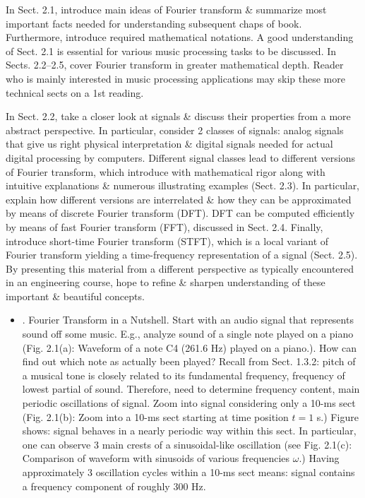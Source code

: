 \documentclass{article}
\begin{document}
\begin{itemize}
	In Sect. 2.1, introduce main ideas of Fourier transform \& summarize most important facts needed for understanding subsequent chaps of book. Furthermore, introduce required mathematical notations. A good understanding of Sect. 2.1 is essential for various music processing tasks to be discussed. In Sects. 2.2--2.5, cover Fourier transform in greater mathematical depth. Reader who is mainly interested in music processing applications may skip these more technical sects on a 1st reading.
	
	In Sect. 2.2, take a closer look at signals \& discuss their properties from a more abstract perspective. In particular, consider 2 classes of signals: analog signals that give us right physical interpretation \& digital signals needed for actual digital processing by computers. Different signal classes lead to different versions of Fourier transform, which introduce with mathematical rigor along with intuitive explanations \& numerous illustrating examples (Sect. 2.3). In particular, explain how different versions are interrelated \& how they can be approximated by means of discrete Fourier transform (DFT). DFT can be computed efficiently by means of fast Fourier transform (FFT), discussed in Sect. 2.4. Finally, introduce short-time Fourier transform (STFT), which is a local variant of Fourier transform yielding a time-frequency representation of a signal (Sect. 2.5). By presenting this material from a different perspective as typically encountered in an engineering course, hope to refine \& sharpen understanding of these important \& beautiful concepts.
	\begin{itemize}
		\item {. Fourier Transform in a Nutshell.} Start with an audio signal that represents sound off some music. E.g., analyze sound of a single note played on a piano ({\sf Fig. 2.1(a): Waveform of a note C4 (261.6 Hz) played on a piano.}). How can find out which note as actually been played? Recall from Sect. 1.3.2: pitch of a musical tone is closely related to its fundamental frequency, frequency of lowest partial of sound. Therefore, need to determine frequency content, main periodic oscillations of signal. Zoom into signal considering only a 10-ms sect ({\sf Fig. 2.1(b): Zoom into a 10-ms sect starting at time position $t = 1$ s.}) Figure shows: signal behaves in a nearly periodic way within this sect. In particular, one can observe 3 main crests of a sinusoidal-like oscillation (see {\sf Fig. 2.1(c): Comparison of waveform with sinusoids of various frequencies $\omega$.}) Having approximately 3 oscillation cycles within a 10-ms sect means: signal contains a frequency component of roughly 300 Hz.
		

\end{itemize}
\end{itemize}
\end{document}
